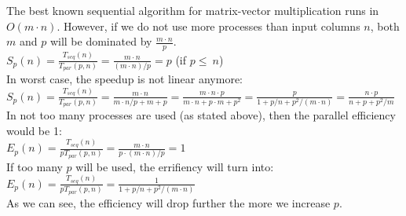 \documentclass[a4paper,%
11pt,%
DIV=12,
headsepline,%
headings=normal,
]{scrartcl}
\begin{document}
\noindent The best known sequential algorithm for matrix-vector multiplication runs in $O(m \cdot n)$. However, if we do not use more processes than input columns $n$, both $m$ and $p$ will be dominated by $\frac{m \cdot n}{p}$.\\
$\displaystyle S_{p}(n)=\frac{T_{seq}(n)}{T_{par}(p,n)} = \frac{m \cdot n}{(m \cdot n)/p } = p$ (if $p \leq\ n$)
\\[0.5 em]
In worst case, the speedup is not linear anymore:
\\[0.5 em]
$\displaystyle S_{p}(n)=\frac{T_{seq}(n)}{T_{par}(p,n)} = \frac{m \cdot n}{m \cdot n/p + m + p} = \frac{m \cdot n \cdot p}{m \cdot n + p \cdot  m + p^2} = \frac{p}{1 + p/n + p^2/(m \cdot n)} = \frac{n \cdot p}{n + p + p^2/m}$
\\[0.5 em]
In not too many processes are used (as stated above), then the parallel efficiency would be 1:
\\[0.5 em]
$\displaystyle E_{p}(n)=\frac{T_{seq}(n)}{pT_{par}(p,n)} = \frac{m \cdot n}{p \cdot (m \cdot n)/p} = 1 $
\\[0.5 em]
If too many $p$ will be used, the errifiency will turn into:
\\[0.5 em]
$\displaystyle E_{p}(n)=\frac{T_{seq}(n)}{pT_{par}(p,n)} = \frac{1}{1 + p/n + p^2/(m \cdot n)} $
\\[0.5 em]
As we can see, the efficiency will drop further the more we increase $p$.
\end{document}
